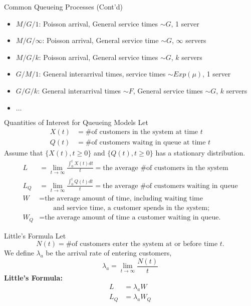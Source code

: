 \documentclass[letterpaper,handout]{beamer}
\begin{document}
\begin{frame}{Common Queueing Processes (Cont'd)}
\begin{itemize}
\itemsep=12pt
\item $M/G/1$: Poisson arrival, General service times $\sim G$, 1 server
\item $M/G/\infty$: Poisson arrival, General service time $\sim G$, $\infty$ servers
\item $M/G/k$: Poisson arrival, General service times $\sim G$, $k$ servers
\item $G/M/1$: General interarrival times, service times $\sim Exp(\mu)$, 1 server
\item $G/G/k$: General interarrival times $\sim F$, General service times $\sim G$, $k$ servers
\item $\ldots$
\end{itemize}
\end{frame}
\begin{frame}{Quantities of Interest for Queueing Models}
Let
\begin{align*}
X(t) &= \text{\# of customers in the system at time }t\\
Q(t) &= \text{\# of customers waitng in queue at time }t
\end{align*}
Assume that $\{X(t), t \ge 0\}$ and $\{Q(t), t \ge 0\}$ has a stationary distribution.
\begin{align*}
L&=\lim_{t\to\infty}\frac{\int_0^t X(t)dt}{t}=\text{the  average \# of customers in the system}\\
L_Q&=\lim_{t\to\infty}\frac{\int_0^t Q(t)dt}{t}=\text{the average \# of customers waiting in queue}\\
W&=\text{the average amount of time, including waiting time }\\
 &\qquad\text{and service time, a customer spends in the system;}\\
W_Q&=\text{the average amount of time a customer waiting in queue.}
\end{align*}
\end{frame}
\begin{frame}{Little's Formula}
Let
$$N(t) = \text{\# of customers enter the system at or before time }t.$$
We define $\lambda_a$ be the arrival rate of entering customers,
$$
\lambda_a=\lim_{t\to\infty}\frac{N(t)}{t}
$$
\textbf{Little's Formula:}
\begin{align*}
L &=\lambda_a W\\
L_Q &=\lambda_a W_Q
\end{align*}
\end{frame}
\end{document}
